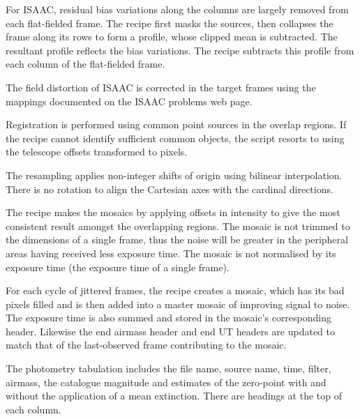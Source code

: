 \documentclass[twoside,11pt]{article}
\newcommand{\htmladdnormallink}[2]{#1}
\renewcommand{\_}{\texttt{\symbol{95}}}
\newcommand{\sstitem}{\item}
\begin{document}
{{{         \sstitem
         For ISAAC, residual bias variations along the columns are
         largely removed from each flat-fielded frame.  The recipe first
         masks the sources, then collapses the frame along its rows to form
         a profile, whose clipped mean is subtracted.  The resultant profile
         reflects the bias variations.  The recipe subtracts this profile
         from each column of the flat-fielded frame.

         \sstitem
         The field distortion of ISAAC is corrected in the target frames
         using the mappings documented on the 
         \htmladdnormallink{ISAAC problems web page}
         {http://www.eso.org/instruments/isaac/problems_tips.html}.

         \sstitem
         Registration is performed using common point sources in the
         overlap regions.  If the recipe cannot identify sufficient common
         objects, the script resorts to using the telescope offsets
         transformed to pixels.

         \sstitem
         The resampling applies non-integer shifts of origin using
         bilinear interpolation.  There is no rotation to align the
         Cartesian axes with the cardinal directions.

         \sstitem
         The recipe makes the mosaics by applying offsets in intensity
         to give the most consistent result amongst the overlapping regions.
         The mosaic is not trimmed to the dimensions of a single frame, thus
         the noise will be greater in the peripheral areas having received
         less exposure time.  The mosaic is not normalised by its exposure
         time (the exposure time of a single frame).

         \sstitem
         For each cycle of jittered frames, the recipe creates a mosaic,
         which has its bad pixels filled and is then added into a master
         mosaic of improving signal to noise.  The exposure time is also
         summed and stored in the mosaic's corresponding header.  Likewise 
         the end airmass header and end UT headers are updated to match that
         of the last-observed frame contributing to the mosaic.

         \sstitem
         The photometry tabulation includes the file name, source name,
         time, filter, airmass, the catalogue magnitude and estimates of
         the zero-point with and without the application of a mean
         extinction.  There are headings at the top of each column.

}}}
\end{document}
